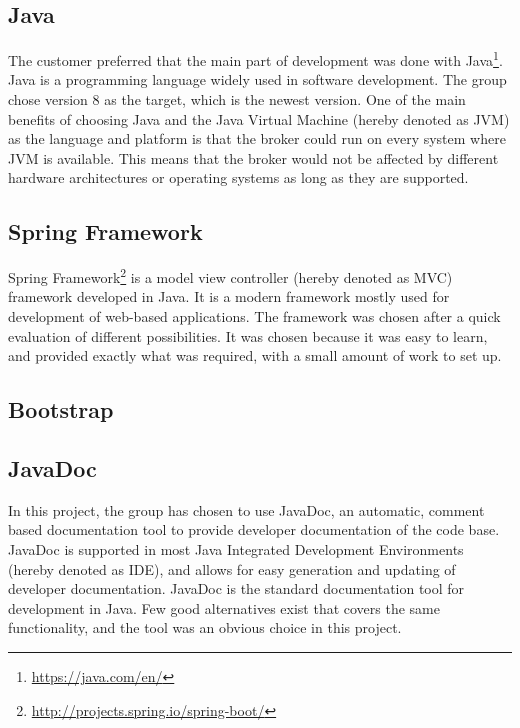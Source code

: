 \subsection{Java}
\label{subsec:prestudies-tools-java}

The customer preferred that the main part of development was done with Java\footnote{\url{https://java.com/en/}}. Java is a programming language widely used in software development. The group chose version 8 as the target, which is the newest version. One of the main benefits of choosing Java and the Java Virtual Machine (hereby denoted as JVM) as the language and platform is that the broker could run on every system where JVM is available. This means that the broker would not be affected by different hardware architectures or operating systems as long as they are supported.

\subsection{Spring Framework}
\label{subsec:prestudies-tools-spring_mvc}

Spring Framework\footnote{\url{http://projects.spring.io/spring-boot/}} is a model view controller (hereby denoted as MVC) framework developed in Java. It is a modern framework mostly used for development of web-based applications. The framework was chosen after a quick evaluation of different possibilities. It was chosen because it was easy to learn, and provided exactly what was required, with a small amount of work to set up.

\subsection{Bootstrap}
\label{subsec:prestudies-tools-bootstrap}

\subsection{JavaDoc}
\label{subsec:prestudies-tools-javadoc}

In this project, the group has chosen to use JavaDoc, an automatic, comment based documentation tool to provide developer documentation of the code base. JavaDoc is supported in most Java Integrated Development Environments (hereby denoted as IDE), and allows for easy generation and updating of developer documentation. JavaDoc is the standard documentation tool for development in Java. Few good alternatives exist that covers the same functionality, and the tool was an obvious choice in this project.

